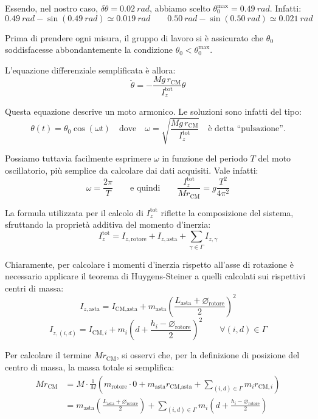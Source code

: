 \documentclass{article}
\newcommand*{\diam}{\varnothing}
\begin{document}
Essendo, nel nostro caso, $\delta\theta=\qty{0.02}{rad}$, abbiamo scelto
$\theta_0^\text{max} = \qty{0.49}{rad}$. Infatti:
\[
  \qty{0.49}{rad} - \sin(\qty{0.49}{rad}) \simeq \qty{0.019}{rad}
  \qquad
  \qty{0.50}{rad} - \sin(\qty{0.50}{rad}) \simeq \qty{0.021}{rad}
\]

Prima di prendere ogni misura, il gruppo di lavoro si è assicurato
che $\theta_0$ soddisfacesse abbondantemente la condizione
$\theta_0<\theta_0^\text{max}$.

L'equazione differenziale semplificata è allora:
\[ \ddot{\theta} = -\frac{Mg\,r_\text{CM}}{I_z^\text{tot}} \theta \]

Questa equazione descrive un moto armonico. Le soluzioni sono infatti
del tipo:
\[
  \theta(t) = \theta_0\cos(\omega t)
  \quad\text{dove}\quad
  \omega = \sqrt{\frac{Mg\,r_\text{CM}}{I_z^\text{tot}}}\quad\text{è detta “pulsazione”}.
\]

Possiamo tuttavia facilmente esprimere $\omega$ in funzione del periodo
$T$ del moto oscillatorio, più semplice da calcolare dai dati acquisiti.
Vale infatti:
\[
  \omega = \frac{2\pi}{T}
  \qquad\text{e quindi}\qquad
  \frac{I_z^\text{tot}}{Mr_\text{CM}} = g \frac{T^2}{4\pi^2}
\]

La formula utilizzata per il calcolo di $I_z^\text{tot}$ riflette la composizione
del sistema, sfruttando la proprietà additiva del momento d'inerzia:
\[I_z^\text{tot} = I_{z,\text{rotore}} + I_{z,\text{asta}} + \sum_{\gamma\in\Gamma} I_{z,\gamma}\]

Chiaramente, per calcolare i momenti d'inerzia rispetto all'asse di
rotazione è necessario applicare il teorema di Huygens-Steiner
a quelli calcolati sui rispettivi centri di massa:
\[
  I_{z,\text{asta}} = I_\text{CM,asta} + m_\text{asta}\left(\frac{L_\text{asta} + \diam_\text{rotore}}{2}\right)^2
\]\[
  I_{z,(i,d)} = I_{\text{CM},i} + m_i\left(d + \frac{h_i - \diam_\text{rotore}}{2}\right)^2\qquad\forall(i,d)\in\Gamma
\]

Per calcolare il termine $M r_\text{CM}$, si osservi che, per la
definizione di posizione del centro di massa, la massa totale si
semplifica:
\[\begin{aligned}
  Mr_\text{CM} &= M\cdot \frac{1}{M}\left(
    m_\text{rotore}\cdot 0 + m_\text{asta} r_\text{CM,asta} +
    \sum_{(i,d)\in\Gamma}{m_i r_{\text{CM},i}}
  \right) \\&= m_\text{asta}\left(\frac{L_\text{asta} + \diam_\text{rotore}}{2}\right) +
    \sum_{(i,d)\in\Gamma}{m_i \left(d + \frac{h_i - \diam_\text{rotore}}{2}\right)}
\end{aligned}\]
\end{document}
